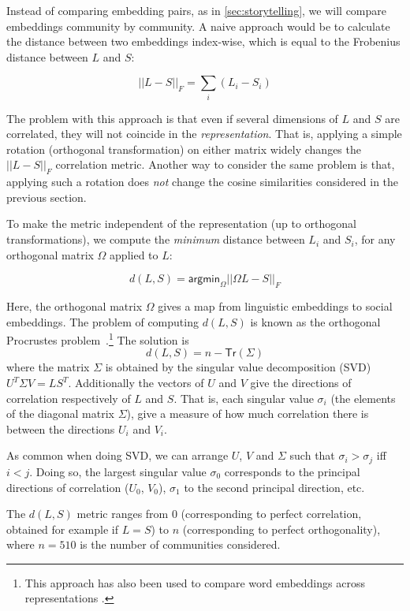 \documentclass[11pt]{article}
\begin{document}

Instead of comparing embedding pairs, as in \cref{sec:storytelling}, 
we will compare embeddings community by community.
A naive approach would be to 
calculate the distance between two embeddings index-wise, which is
equal to the Frobenius distance between \(L\) and \(S\):

\[||L-S||_F = \sum_i (L_i - S_i)\]

The problem with this approach is that even if several dimensions of
\(L\) and \(S\) are correlated, they will not coincide in the
\emph{representation}. That is, applying a simple rotation (orthogonal
transformation) on either matrix widely changes the \(||L-S||_F\)
correlation metric. Another way to consider the same problem is that,
applying such a rotation does \emph{not} change the cosine similarities
considered in the previous section.

To make the metric independent of the representation (up to orthogonal
transformations), we compute the \emph{minimum} distance between
\(L_i\) and \(S_i\), for any orthogonal matrix \(\Omega\) applied to
\(L\):

\[d(L,S) = \mathsf{argmin}_\Omega ||ΩL-S||_F\]

Here, the orthogonal matrix \(Ω\) gives a map from linguistic embeddings to social embeddings.
The problem of computing \(d(L,S)\) is known as the orthogonal Procrustes problem~\citep{Gower2004}.\footnote{
This approach has also been used to compare word embeddings across representations \citep[e.g.,][]{Hamilton2016a}.}
The solution is
\[d(L,S) = n - \mathsf {Tr} (Σ)\] where the matrix \(Σ\) is obtained by the singular value
decomposition (SVD) \(U^TΣV = LS^T\). Additionally the vectors of \(U\) and \(V\) give
the directions of correlation respectively of \(L\) and \(S\). That is, each
singular value \(\sigma_i\) (the elements of the diagonal matrix \(Σ\)), give a measure of how much
correlation there is between the directions \(U_i\) and \(V_i\).

As common when doing SVD, we can arrange \(U\), \(V\) and \(Σ\) such
that \(σ_i > σ_j\) iff \(i < j\). Doing so, the largest singular value
\(σ_0\) corresponds to the principal directions of correlation
(\(U_0\), \(V_0\)), \(σ_1\) to the second principal direction, etc.

The \(d(L,S)\) metric ranges from \(0\) (corresponding to perfect
correlation, obtained for example if \(L=S\)) to \(n\) (corresponding
to perfect orthogonality), where $n=510$ is the number of communities
considered.
\end{document}
